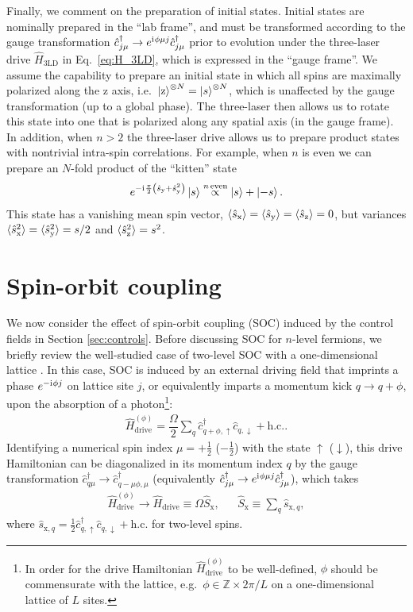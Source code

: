 \documentclass[aps,pra,nofootinbib,twocolumn,superscriptaddress]{revtex4-2}
\renewcommand{\t}{\text} %
\newcommand{\f}[2]{\dfrac{#1}{#2}} %
\newcommand{\p}[1]{\left(#1\right)} %
\newcommand{\bk}{\braket} %
\renewcommand{\i}{\mathrm{i}\mkern1mu} %
\newcommand{\1}{\mathds{1}}
\renewcommand{\c}{\hat c}
\newcommand{\s}{\hat s}
\renewcommand{\H}{\hat H}
\renewcommand{\S}{\hat S}
\newcommand{\up}{\uparrow}
\newcommand{\dn}{\downarrow}
\newcommand{\x}{\text{x}}
\newcommand{\y}{\text{y}}
\newcommand{\z}{\text{z}}
\newcommand{\ZZ}{\mathbb{Z}}
\begin{document}
Finally, we comment on the preparation of initial states.
Initial states are nominally prepared in the ``lab frame'', and must be transformed according to the gauge transformation $\c_{j\mu}^\dag\to e^{\i\phi\mu j} \c_{j\mu}^\dag$ prior to evolution under the three-laser drive $\H_{\t{3LD}}$ in Eq.~\eqref{eq:H_3LD}, which is expressed in the ``gauge frame''.
We assume the capability to prepare an initial state in which all spins are maximally polarized along the z axis, i.e.~$\ket{\z}^{\otimes N}=\ket{s}^{\otimes N}$, which is unaffected by the gauge transformation (up to a global phase).
The three-laser then allows us to rotate this state into one that is polarized along any spatial axis (in the gauge frame).
In addition, when $n>2$ the three-laser drive allows us to prepare product states with nontrivial intra-spin correlations.
For example, when $n$ is even we can prepare an $N$-fold product of the ``kitten'' state
\begin{align}
  e^{-\i\frac{\pi}{2}\p{\s_\y + \s_\y^2}} \ket{s}
  \stackrel{n\,\t{even}}{\propto} \ket{s} + \ket{-s}.
\end{align}
This state has a vanishing mean spin vector, $\bk{\s_\x}=\bk{\s_\y}=\bk{\s_\z}=0$, but variances $\bk{\s_\x^2}=\bk{\s_\y^2}=s/2$ and $\bk{\s_\z^2}=s^2$.

\section{Spin-orbit coupling}
\label{sec:SOC}

We now consider the effect of spin-orbit coupling (SOC) induced by the control fields in Section \ref{sec:controls}.
Before discussing SOC for $n$-level fermions, we briefly review the well-studied case of two-level SOC with a one-dimensional lattice \cite{wall2016synthetic, kolkowitz2016spinorbitcoupled, bromley2018dynamics, he2019engineering}.
In this case, SOC is induced by an external driving field that imprints a phase $e^{-\i\phi j}$ on lattice site $j$, or equivalently imparts a momentum kick $q\to q+\phi$, upon the absorption of a photon\footnote{In order for the drive Hamiltonian $\H_{\t{drive}}^{(\phi)}$ to be well-defined, $\phi$ should be commensurate with the lattice, e.g.~$\phi\in\ZZ\times2\pi/L$ on a one-dimensional lattice of $L$ sites.}:
\begin{align}
  \H_{\t{drive}}^{(\phi)}
  = \f{\Omega}{2} \sum_q \c_{q+\phi,\up}^\dag \c_{q,\dn} + \t{h.c.}.
  \label{eq:drive_2}
\end{align}
Identifying a numerical spin index $\mu=+\frac12$ ($-\frac12$) with the state $\up$ ($\dn$), this drive Hamiltonian can be diagonalized in its momentum index $q$ by the gauge transformation $\c_{q\mu}^\dag\to \c_{q-\mu\phi,\mu}^\dag$ (equivalently $\c_{j\mu}^\dag\to e^{\i\phi\mu j} \c_{j\mu}^\dag$), which takes
\begin{align}
  \H_{\t{drive}}^{(\phi)} \to \H_{\t{drive}} \equiv \Omega \S_\x,
  &&
  \S_\x \equiv \sum_q \s_{\x,q},
  \label{eq:drive_trans}
\end{align}
where $\s_{\x,q}=\frac12 \c_{q,\up}^\dag \c_{q,\dn} + \t{h.c.}$ for two-level spins.
\end{document}
